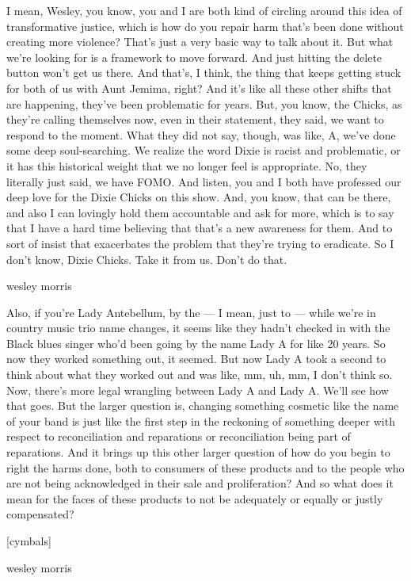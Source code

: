 I mean, Wesley, you know, you and I are both kind of circling around
this idea of transformative justice, which is how do you repair harm
that's been done without creating more violence? That's just a very
basic way to talk about it. But what we're looking for is a framework to
move forward. And just hitting the delete button won't get us there. And
that's, I think, the thing that keeps getting stuck for both of us with
Aunt Jemima, right? And it's like all these other shifts that are
happening, they've been problematic for years. But, you know, the
Chicks, as they're calling themselves now, even in their statement, they
said, we want to respond to the moment. What they did not say, though,
was like, A, we've done some deep soul-searching. We realize the word
Dixie is racist and problematic, or it has this historical weight that
we no longer feel is appropriate. No, they literally just said, we have
FOMO. And listen, you and I both have professed our deep love for the
Dixie Chicks on this show. And, you know, that can be there, and also I
can lovingly hold them accountable and ask for more, which is to say
that I have a hard time believing that that's a new awareness for them.
And to sort of insist that exacerbates the problem that they're trying
to eradicate. So I don't know, Dixie Chicks. Take it from us. Don't do
that.

wesley morris

Also, if you're Lady Antebellum, by the --- I mean, just to --- while
we're in country music trio name changes, it seems like they hadn't
checked in with the Black blues singer who'd been going by the name Lady
A for like 20 years. So now they worked something out, it seemed. But
now Lady A took a second to think about what they worked out and was
like, mm, uh, mm, I don't think so. Now, there's more legal wrangling
between Lady A and Lady A. We'll see how that goes. But the larger
question is, changing something cosmetic like the name of your band is
just like the first step in the reckoning of something deeper with
respect to reconciliation and reparations or reconciliation being part
of reparations. And it brings up this other larger question of how do
you begin to right the harms done, both to consumers of these products
and to the people who are not being acknowledged in their sale and
proliferation? And so what does it mean for the faces of these products
to not be adequately or equally or justly compensated?

{[}cymbals{]}

wesley morris

